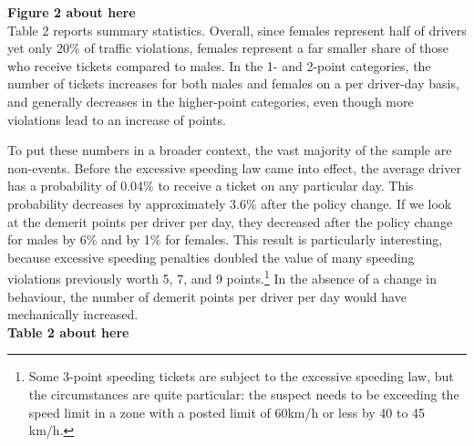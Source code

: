 \textbf{Figure 2 about here} \\

Table 2 reports summary statistics. Overall, since females represent half of drivers yet only 20\% of traffic violations, females represent a far smaller share of those who receive tickets compared to males. In the 1- and 2-point categories, the number of tickets increases for both males and females on a per driver-day basis, and generally decreases in the higher-point categories, even though more violations lead to an increase of points.

To put these numbers in a broader context, the vast majority of the sample are non-events. Before the excessive speeding law came into effect, the average driver has a probability of 0.04\% to receive a ticket on any particular day. This probability decreases by approximately 3.6\% after the policy change. If we look at the demerit points per driver per day, they decreased after the policy change for males by 6\% and by 1\% for females. This result is particularly interesting, because excessive speeding penalties doubled the value of many speeding violations previously worth 5, 7, and 9 points.\footnote{%
Some 3-point speeding tickets are subject to the excessive speeding law, but the circumstances are quite particular: the suspect needs to be exceeding the speed limit in a zone with a posted limit of 60km/h or less by 40 to 45 km/h.}
In the absence of a change in behaviour, the number of demerit points per driver per day would have mechanically increased. \\

\textbf{Table 2 about here} \\

